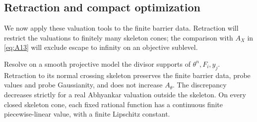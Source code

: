 \subsection{Retraction and compact optimization}

We now apply these valuation tools to the finite barrier data.
Retraction will restrict the valuations to finitely many skeleton
cones; the comparison with \(A_X\) in \eqref{eq:A13} will exclude
escape to infinity on an objective sublevel.

\begin{lemma}
\label{c:skeleton}
Resolve on a smooth projective model the divisor supports of
\(\theta^n,F_i,y_j\).  Retraction to its normal crossing skeleton
preserves the finite barrier data, probe values and probe
Gaussianity, and does not increase \(A_\theta\).  The discrepancy
decreases strictly for a real Abhyankar valuation outside the
skeleton.  On every closed skeleton cone, each fixed rational
function has a continuous finite piecewise-linear value, with
a finite Lipschitz constant.
\end{lemma}

